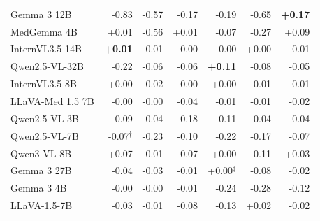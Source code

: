 \begin{table}[h]
\begin{tabular}{lrrrrrr}
Gemma 3 12B & \cellcolor{cfTerra4}-0.83 & \cellcolor{cfTerra4}-0.57 & \cellcolor{cfTerra3}-0.17 & \cellcolor{cfTerra3}-0.19 & \cellcolor{cfTerra4}-0.65 & \cellcolor{cfSlate3}\textbf{+0.17} \\
MedGemma 4B & \cellcolor{cfSlate1}+0.01 & \cellcolor{cfTerra4}-0.56 & \cellcolor{cfSlate1}+0.01 & \cellcolor{cfTerra2}-0.07 & \cellcolor{cfTerra4}-0.27 & \cellcolor{cfSlate2}+0.09 \\
InternVL3.5-14B & \cellcolor{cfSlate1}\textbf{+0.01} & \cellcolor{cfTerra1}-0.01 & \cellcolor{cfTerra1}-0.00 & \cellcolor{cfTerra1}-0.00 & \cellcolor{cfSlate1}+0.00 & \cellcolor{cfTerra1}-0.01 \\
Qwen2.5-VL-32B & \cellcolor{cfTerra3}-0.22 & \cellcolor{cfTerra2}-0.06 & \cellcolor{cfTerra2}-0.06 & \cellcolor{cfSlate3}\textbf{+0.11} & \cellcolor{cfTerra2}-0.08 & \cellcolor{cfTerra2}-0.05 \\
InternVL3.5-8B & \cellcolor{cfSlate1}+0.00 & \cellcolor{cfTerra1}-0.02 & \cellcolor{cfTerra1}-0.00 & \cellcolor{cfSlate1}+0.00 & \cellcolor{cfTerra1}-0.01 & \cellcolor{cfTerra1}-0.01 \\
LLaVA-Med 1.5 7B & \cellcolor{cfTerra1}-0.00 & \cellcolor{cfTerra1}-0.00 & \cellcolor{cfTerra2}-0.04 & \cellcolor{cfTerra1}-0.01 & \cellcolor{cfTerra1}-0.01 & \cellcolor{cfTerra2}-0.02 \\
Qwen2.5-VL-3B & \cellcolor{cfTerra2}-0.09 & \cellcolor{cfTerra2}-0.04 & \cellcolor{cfTerra3}-0.18 & \cellcolor{cfTerra3}-0.11 & \cellcolor{cfTerra2}-0.04 & \cellcolor{cfTerra2}-0.04 \\
Qwen2.5-VL-7B & \cellcolor{cfTerra2}-0.07$^{\dagger}$ & \cellcolor{cfTerra3}-0.23 & \cellcolor{cfTerra3}-0.10 & \cellcolor{cfTerra3}-0.22 & \cellcolor{cfTerra3}-0.17 & \cellcolor{cfTerra2}-0.07 \\
Qwen3-VL-8B & \cellcolor{cfSlate2}+0.07 & \cellcolor{cfTerra1}-0.01 & \cellcolor{cfTerra2}-0.07 & \cellcolor{cfSlate1}+0.00 & \cellcolor{cfTerra3}-0.11 & \cellcolor{cfSlate2}+0.03 \\
Gemma 3 27B & \cellcolor{cfTerra2}-0.04 & \cellcolor{cfTerra2}-0.03 & \cellcolor{cfTerra1}-0.01 & \cellcolor{cfSlate1}+0.00$^{\ddagger}$ & \cellcolor{cfTerra2}-0.08 & \cellcolor{cfTerra1}-0.02 \\
Gemma 3 4B & \cellcolor{cfTerra1}-0.00 & \cellcolor{cfTerra1}-0.00 & \cellcolor{cfTerra1}-0.01 & \cellcolor{cfTerra3}-0.24 & \cellcolor{cfTerra4}-0.28 & \cellcolor{cfTerra3}-0.12 \\
LLaVA-1.5-7B & \cellcolor{cfTerra2}-0.03 & \cellcolor{cfTerra1}-0.01 & \cellcolor{cfTerra2}-0.08 & \cellcolor{cfTerra3}-0.13 & \cellcolor{cfSlate2}+0.02 & \cellcolor{cfTerra1}-0.02 \\

\end{tabular}
\end{table}
